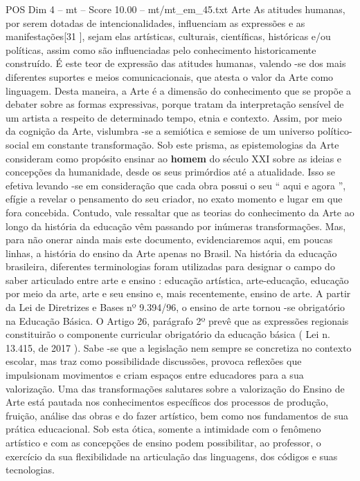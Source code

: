 \begin{textsample}{POS Dim 4 – mt – Score 10.00 – mt/mt\_em\_45.txt}
Arte As atitudes humanas, por serem dotadas de intencionalidades, influenciam as expressões e as manifestações[31 ], sejam elas artísticas, culturais, científicas, históricas e/ou políticas, assim como são influenciadas pelo conhecimento historicamente construído.
É este teor de expressão das atitudes humanas, valendo -se dos mais diferentes suportes e meios comunicacionais, que atesta o valor da Arte como linguagem.
Desta maneira, a Arte é a dimensão do conhecimento que se propõe a debater sobre as formas expressivas, porque tratam da interpretação sensível de um artista a respeito de determinado tempo, etnia e contexto.
Assim, por meio da cognição da Arte, vislumbra -se a semiótica e semiose de um universo político-social em constante transformação.
Sob este prisma, as epistemologias da Arte consideram como propósito ensinar ao \textbf{homem} do século XXI sobre as ideias e concepções da humanidade, desde os seus primórdios até a atualidade.
Isso se efetiva levando -se em consideração que cada obra possui o seu “ aqui e agora ”, efígie a revelar o pensamento do seu criador, no exato momento e lugar em que fora concebida.
Contudo, vale ressaltar que as teorias do conhecimento da Arte ao longo da história da educação vêm passando por inúmeras transformações.
Mas, para não onerar ainda mais este documento, evidenciaremos aqui, em poucas linhas, a história do ensino da Arte apenas no Brasil.
Na história da educação brasileira, diferentes terminologias foram utilizadas para designar o campo do saber articulado entre arte e ensino : educação artística, arte-educação, educação por meio da arte, arte e seu ensino e, mais recentemente, ensino de arte.
A partir da Lei de Diretrizes e Bases nº 9.394/96, o ensino de arte tornou -se obrigatório na Educação Básica.
O Artigo 26, parágrafo 2º prevê que as expressões regionais constituirão o componente curricular obrigatório da educação básica ( Lei n. 13.415, de 2017 ).
Sabe -se que a legislação nem sempre se concretiza no contexto escolar, mas traz como possibilidade discussões, provoca reflexões que impulsionam movimentos e criam espaços entre educadores para a sua valorização.
Uma das transformações salutares sobre a valorização do Ensino de Arte está pautada nos conhecimentos específicos dos processos de produção, fruição, análise das obras e do fazer artístico, bem como nos fundamentos de sua prática educacional.
Sob esta ótica, somente a intimidade com o fenômeno artístico e com as concepções de ensino podem possibilitar, ao professor, o exercício da sua flexibilidade na articulação das linguagens, dos códigos e suas tecnologias.

\end{textsample}
